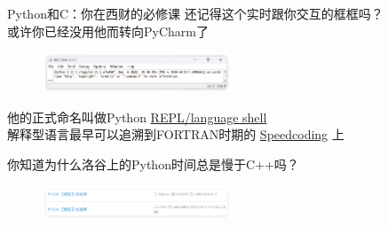 \documentclass[aspectratio=1610]{beamer}
\begin{document}
\begin{frame}{Python和C：你在西财的必修课}
    还记得这个实时跟你交互的框框吗？\\ 或许你已经没用他而转向PyCharm了
    \begin{figure}[htb]
        \centering
        \includegraphics[width=0.5\textwidth]{pic/PythonREPL.png}
    \end{figure}
    他的正式命名叫做Python \href{https://en.wikipedia.org/wiki/Repl}{\alert{REPL/language shell}} \\[1em]

    解释型语言最早可以追溯到FORTRAN时期的 \href{https://en.wikipedia.org/wiki/Speedcoding}{Speedcoding} 上

    你知道为什么洛谷上的Python时间总是慢于C++吗？
    \begin{figure}[htb]
        \centering
        \includegraphics[width=0.5\textwidth]{pic/qpow.png}
    \end{figure}
\end{frame}
\end{document}
